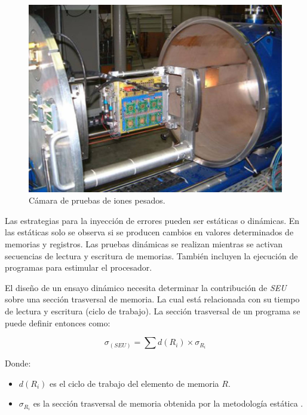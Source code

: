 \begin{figure}[htbp]
	\centering
	\includegraphics[width=\textwidth]{./Figures/heavy_ion_latchup_tests_in_louvain_la_neuve.jpg}
    \caption{Cámara de pruebas de iones pesados\protect\footnotemark.}
	\label{fig:iones}
\end{figure}


Las estrategias para la inyección de errores pueden ser estáticas o dinámicas.
En las estáticas solo se observa si se producen cambios en valores determinados de memorias y registros.
Las pruebas dinámicas se realizan mientras se activan secuencias de lectura y escritura de memorias.
También incluyen la ejecución de programas para estimular el procesador.

El diseño de un ensayo dinámico necesita determinar la contribución de \emph{SEU} sobre una sección trasversal de memoria.
La cual está relacionada con su tiempo de lectura y escritura (ciclo de trabajo).
La sección trasversal de un programa se puede definir entonces como:

\begin{equation}
	\label{eq:crosssection}
    \sigma_{(SEU)} = \sum{d(R_i) \times \sigma_{R_i}}
\end{equation}

\newpage

Donde:
\begin{itemize}
    \item $ d(R_i) $ es el ciclo de trabajo del elemento de memoria $ R $.
    \item $ \sigma_{R_i} $ es la sección trasversal de memoria obtenida por la metodología estática \citep{ARTICLE:velazco}.
\end{itemize}


